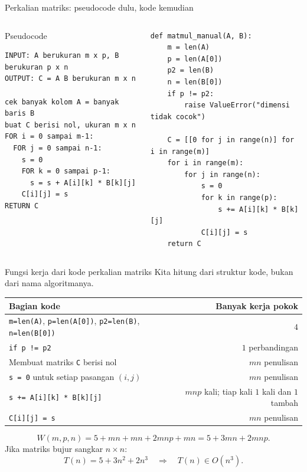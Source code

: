 \documentclass[aspectratio=169,11pt]{beamer}
\begin{document}
\begin{frame}[fragile]{Perkalian matriks: pseudocode dulu, kode kemudian}
\begin{columns}[T]
\begin{block}{Pseudocode}
\scriptsize
\begin{verbatim}
INPUT: A berukuran m x p, B berukuran p x n
OUTPUT: C = A B berukuran m x n

cek banyak kolom A = banyak baris B
buat C berisi nol, ukuran m x n
FOR i = 0 sampai m-1:
  FOR j = 0 sampai n-1:
    s = 0
    FOR k = 0 sampai p-1:
      s = s + A[i][k] * B[k][j]
    C[i][j] = s
RETURN C
\end{verbatim}
\end{block}
\pause
{}
\begin{lstlisting}
def matmul_manual(A, B):
    m = len(A)
    p = len(A[0])
    p2 = len(B)
    n = len(B[0])
    if p != p2:
        raise ValueError("dimensi tidak cocok")

    C = [[0 for j in range(n)] for i in range(m)]
    for i in range(m):
        for j in range(n):
            s = 0
            for k in range(p):
                s += A[i][k] * B[k][j]
            C[i][j] = s
    return C
\end{lstlisting}
\end{columns}
\end{frame}

\begin{frame}{Fungsi kerja dari kode perkalian matriks}
Kita hitung dari struktur kode, bukan dari nama algoritmanya.
\vspace{2mm}
\begin{center}
\begin{tabular}{p{7.4cm}r}
\toprule
Bagian kode & Banyak kerja pokok \\
\midrule
\texttt{m=len(A)}, \texttt{p=len(A[0])}, \texttt{p2=len(B)}, \texttt{n=len(B[0])} & $4$ \\
\texttt{if p != p2} & $1$ perbandingan \\
Membuat matriks \texttt{C} berisi nol & $mn$ penulisan \\
\texttt{s = 0} untuk setiap pasangan $(i,j)$ & $mn$ penulisan \\
\texttt{s += A[i][k] * B[k][j]} & $mnp$ kali; tiap kali $1$ kali dan $1$ tambah \\
\texttt{C[i][j] = s} & $mn$ penulisan \\
\bottomrule
\end{tabular}
\end{center}
\pause
\[
W(m,p,n)=5+mn+mn+2mnp+mn=5+3mn+2mnp.
\]
Jika matriks bujur sangkar $n\times n$:
\[
T(n)=5+3n^2+2n^3 \quad\Rightarrow\quad T(n)\in O(n^3).
\]
\end{frame}
\end{document}
